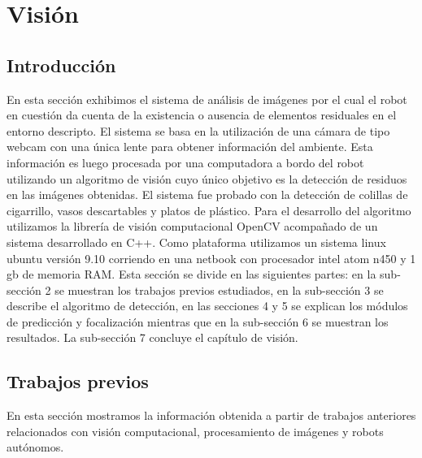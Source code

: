 ﻿\section{Visi\'on}

\subsection{Introducción}
En esta sección exhibimos el sistema de análisis de imágenes por 
el cual el robot en cuestión da cuenta de la existencia o ausencia de 
elementos residuales en el entorno descripto. El sistema se basa en la 
utilización de una cámara de tipo webcam con una única lente para 
obtener información del ambiente. Esta información es luego procesada 
por una computadora a bordo del robot utilizando un algoritmo de visión 
cuyo único objetivo es la detección de residuos 
en las imágenes obtenidas. El sistema fue probado con la detección de 
colillas de cigarrillo, vasos descartables y platos de plástico. Para 
el desarrollo del algoritmo utilizamos la librería de visión 
computacional OpenCV \cite{opencv_library} acompañado de un sistema 
desarrollado en C++. Como plataforma utilizamos un sistema linux 
ubuntu versión 9.10 corriendo en una netbook con procesador intel atom 
n450 y 1 gb de memoria RAM.
Esta sección se divide en las siguientes partes: en la sub-sección 2 se 
muestran los trabajos previos estudiados, en la sub-sección 3 se 
describe el algoritmo de detección, en las secciones 4 y 5 se explican 
los módulos de predicción y focalización mientras que en la 
sub-sección 6 se muestran los resultados. La sub-sección 7 concluye 
el capítulo de visión.

\subsection{Trabajos previos}
En esta sección mostramos la información obtenida a partir de 
trabajos anteriores relacionados con visión computacional, 
procesamiento de imágenes y robots autónomos.
 
